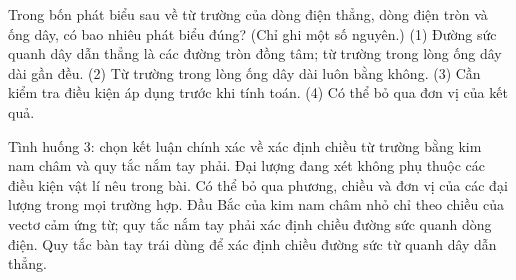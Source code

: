 \begin{ex}
Trong bốn phát biểu sau về từ trường của dòng điện thẳng, dòng điện tròn và ống dây, có bao nhiêu phát biểu đúng? (Chỉ ghi một số nguyên.) (1) Đường sức quanh dây dẫn thẳng là các đường tròn đồng tâm; từ trường trong lòng ống dây dài gần đều. (2) Từ trường trong lòng ống dây dài luôn bằng không. (3) Cần kiểm tra điều kiện áp dụng trước khi tính toán. (4) Có thể bỏ qua đơn vị của kết quả.
\end{ex}

\begin{ex}
Tình huống 3: chọn kết luận chính xác về xác định chiều từ trường bằng kim nam châm và quy tắc nắm tay phải.
\choice
{Đại lượng đang xét không phụ thuộc các điều kiện vật lí nêu trong bài.}
{Có thể bỏ qua phương, chiều và đơn vị của các đại lượng trong mọi trường hợp.}
{\True Đầu Bắc của kim nam châm nhỏ chỉ theo chiều của vectơ cảm ứng từ; quy tắc nắm tay phải xác định chiều đường sức quanh dòng điện.}
{Quy tắc bàn tay trái dùng để xác định chiều đường sức từ quanh dây dẫn thẳng.}
\end{ex}

